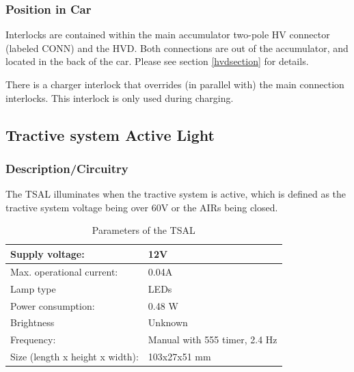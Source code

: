 \documentclass{article}
\begin{document}

        \subsubsection{Position in Car}

            Interlocks are contained within the main accumulator two-pole HV connector (labeled CONN) and the HVD. Both connections are out of the accumulator, and located in the back of the car. Please see section \ref{hvdsection} for details.

            There is a charger interlock that overrides (in parallel with) the main connection interlocks. This interlock is only used during charging.

    \subsection{Tractive system Active Light}

        \subsubsection{Description/Circuitry}


            The TSAL illuminates when the tractive system is active, which is defined as the tractive system voltage being over 60V or the AIRs being closed.

            \begin{table}[H]
                \centering
                \begin{tabular}{|l|l|}
                \hline
                Supply voltage: & 12V \\ \hline
                Max. operational current: &  0.04A\\ \hline
                Lamp type & LEDs \\ \hline
                Power consumption: & 0.48 W\\ \hline
                Brightness & Unknown \\ \hline
                Frequency: & Manual with 555 timer, 2.4 Hz \\ \hline
                Size (length x height x width): & 103x27x51 mm \\ \hline
                \end{tabular}
                \caption{Parameters of the TSAL}
                \label{TSALparameters}
            \end{table}
\end{document}
